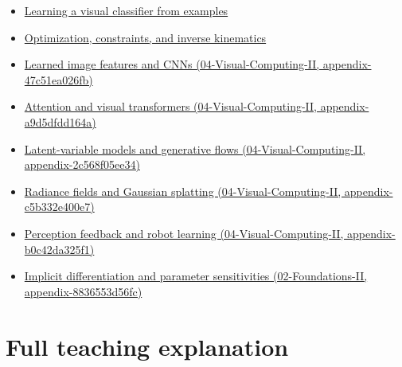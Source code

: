 \begin{itemize}
\tightlist
\item
  \href{Continuous\%20Notes/University\%20-\%20Worlds,\%20Images\%20and\%20Inference\%20-\%20Graphics,\%20Vision\%20and\%20Photography\#Learning\%20a\%20visual\%20classifier\%20from\%20examples}{Learning a visual classifier from examples}
\item
  \href{Continuous\%20Notes/University\%20-\%20Worlds,\%20Images\%20and\%20Inference\%20-\%20Graphics,\%20Vision\%20and\%20Photography\#Optimization,\%20constraints,\%20and\%20inverse\%20kinematics}{Optimization, constraints, and inverse kinematics}
\item
  \href{../04-Visual-Computing-II/main.pdf\#nameddest=appendix-47c51ea026fb}{Learned image features and CNNs (04-Visual-Computing-II, appendix-47c51ea026fb)}
\item
  \href{../04-Visual-Computing-II/main.pdf\#nameddest=appendix-a9d5dfdd164a}{Attention and visual transformers (04-Visual-Computing-II, appendix-a9d5dfdd164a)}
\item
  \href{../04-Visual-Computing-II/main.pdf\#nameddest=appendix-2c568f05ee34}{Latent-variable models and generative flows (04-Visual-Computing-II, appendix-2c568f05ee34)}
\item
  \href{../04-Visual-Computing-II/main.pdf\#nameddest=appendix-c5b332e400e7}{Radiance fields and Gaussian splatting (04-Visual-Computing-II, appendix-c5b332e400e7)}
\item
  \href{../04-Visual-Computing-II/main.pdf\#nameddest=appendix-b0c42da325f1}{Perception feedback and robot learning (04-Visual-Computing-II, appendix-b0c42da325f1)}
\item
  \href{../02-Foundations-II/main.pdf\#nameddest=appendix-8836553d56fc}{Implicit differentiation and parameter sensitivities (02-Foundations-II, appendix-8836553d56fc)}
\end{itemize}

\section{Full teaching explanation}\label{appendix-40df0855b4a7-full-teaching-explanation}

